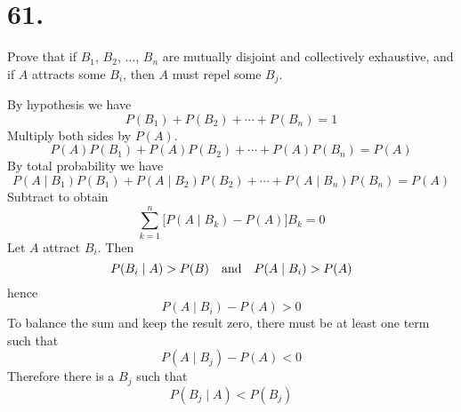\section*{61.}
Prove that if $B_1$, $B_2$, $\ldots$, $B_n$ are mutually disjoint and
collectively exhaustive,
and if $A$ attracts some $B_i$, then $A$ must repel some $B_j$.

\bigskip
\noindent
By hypothesis we have
$$P(B_1)+P(B_2)+\cdots+P(B_n)=1$$
Multiply both sides by $P(A)$.
$$P(A)P(B_1)+P(A)P(B_2)+\cdots+P(A)P(B_n)=P(A)$$
By total probability we have
$$P(A\mid B_1)P(B_1)+P(A\mid B_2)P(B_2)+\cdots+P(A\mid B_n)P(B_n)=P(A)$$
Subtract to obtain
$$\sum_{k=1}^n\bigg[P(A\mid B_k)-P(A)\bigg]B_k=0$$
Let $A$ attract $B_i$. Then
$$P(B_i\mid A)>P(B)\quad\hbox{and}\quad P(A\mid B_i)>P(A)$$
hence
$$P(A\mid B_i)-P(A)>0$$
To balance the sum and keep the result zero, there must be at least one term
such that
$$P(A\mid B_j)-P(A)<0$$
Therefore there is a $B_j$ such that
$$P(B_j\mid A)<P(B_j)$$

